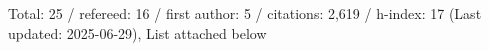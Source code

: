 Total: 25 / refereed: 16 / first author: 5 / citations: 2,619 / h-index: 17 (Last updated: 2025-06-29), List attached below